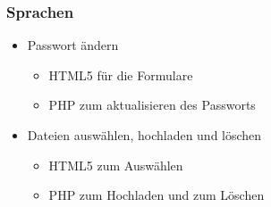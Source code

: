\begin{frame} %
  \frametitle{Sprachen} %

   \begin{itemize}
    \item Passwort ändern
\bigskip
    \begin{itemize}
     \item HTML5 für die Formulare
     \item PHP zum aktualisieren des Passworts
    \end{itemize}
\bigskip
    \item Dateien auswählen, hochladen und löschen
\bigskip
    \begin{itemize}
     \item HTML5 zum Auswählen
     \item PHP zum Hochladen und zum Löschen
    \end{itemize}

   \end{itemize}

\end{frame}


